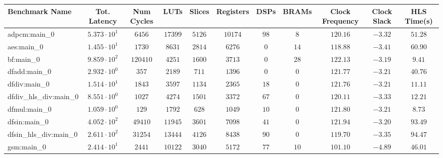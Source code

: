 \begin{tabular}{|l|c|c|c|c|c|c|c|c|c|c|}
\hline
Benchmark Name          & Tot. Latency           & Num Cycles & LUTs       & Slices    & Registers & DSPs    & BRAMs   & Clock Frequency & Clock Slack & HLS Time(s) \\
\hline
adpcm:main\_0           & $ 5.373 \cdot 10^{1} $ & $ 6456   $ & $ 17399  $ & $ 5126  $ & $ 10174 $ & $ 98  $ & $ 8   $ & $ 120.16      $ & $ -3.32   $ & $ 51.28   $ \\
aes:main\_0             & $ 1.455 \cdot 10^{1} $ & $ 1730   $ & $ 8631   $ & $ 2814  $ & $ 6276  $ & $ 0   $ & $ 14  $ & $ 118.88      $ & $ -3.41   $ & $ 60.90   $ \\
bf:main\_0              & $ 9.859 \cdot 10^{2} $ & $ 120410 $ & $ 4251   $ & $ 1600  $ & $ 3713  $ & $ 0   $ & $ 28  $ & $ 122.13      $ & $ -3.19   $ & $ 9.41    $ \\
dfadd:main\_0           & $ 2.932 \cdot 10^{0} $ & $ 357    $ & $ 2189   $ & $ 711   $ & $ 1396  $ & $ 0   $ & $ 0   $ & $ 121.77      $ & $ -3.21   $ & $ 40.76   $ \\
dfdiv:main\_0           & $ 1.514 \cdot 10^{1} $ & $ 1843   $ & $ 3597   $ & $ 1134  $ & $ 2365  $ & $ 18  $ & $ 0   $ & $ 121.76      $ & $ -3.21   $ & $ 11.11   $ \\
dfdiv\_hls\_div:main\_0 & $ 8.551 \cdot 10^{0} $ & $ 1027   $ & $ 4274   $ & $ 1501  $ & $ 3372  $ & $ 67  $ & $ 0   $ & $ 120.11      $ & $ -3.33   $ & $ 12.21   $ \\
dfmul:main\_0           & $ 1.059 \cdot 10^{0} $ & $ 129    $ & $ 1792   $ & $ 628   $ & $ 1049  $ & $ 10  $ & $ 0   $ & $ 121.80      $ & $ -3.21   $ & $ 8.73    $ \\
dfsin:main\_0           & $ 4.052 \cdot 10^{2} $ & $ 49410  $ & $ 11945  $ & $ 3601  $ & $ 7098  $ & $ 41  $ & $ 0   $ & $ 121.94      $ & $ -3.20   $ & $ 93.49   $ \\
dfsin\_hls\_div:main\_0 & $ 2.611 \cdot 10^{2} $ & $ 31254  $ & $ 13444  $ & $ 4126  $ & $ 8438  $ & $ 90  $ & $ 0   $ & $ 119.70      $ & $ -3.35   $ & $ 94.47   $ \\
gsm:main\_0             & $ 2.414 \cdot 10^{1} $ & $ 2441   $ & $ 10122  $ & $ 3040  $ & $ 5172  $ & $ 77  $ & $ 10  $ & $ 101.10      $ & $ -4.89   $ & $ 46.01   $ \\

\end{tabular}
